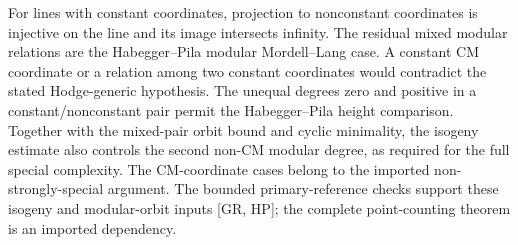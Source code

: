 \documentclass[10pt]{article}
\begin{document}
For lines with constant coordinates, projection to nonconstant coordinates is injective on the line and its image intersects infinity. The residual mixed modular relations are the Habegger–Pila modular Mordell–Lang case. A constant CM coordinate or a relation among two constant coordinates would contradict the stated Hodge-generic hypothesis. The unequal degrees zero and positive in a constant/nonconstant pair permit the Habegger–Pila height comparison. Together with the mixed-pair orbit bound and cyclic minimality, the isogeny estimate also controls the second non-CM modular degree, as required for the full special complexity. The CM-coordinate cases belong to the imported non-strongly-special argument. The bounded primary-reference checks support these isogeny and modular-orbit inputs [GR, HP]; the complete point-counting theorem is an imported dependency.\par
\end{document}
